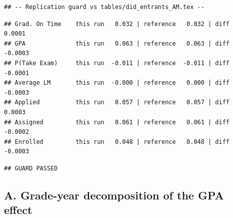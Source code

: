 \documentclass[
]{article}
\begin{document}
\begin{table}[htbp]
   \caption{Regression Results: All 9th-Grade Entrants (Guard Replication)}\label{tab: entrants guard}
   \centerline{}
\end{table}

\begin{verbatim}
## -- Replication guard vs tables/did_entrants_AM.tex --
\end{verbatim}

\begin{verbatim}
## Grad. On Time    this run   0.032 | reference   0.032 | diff   0.0001
## GPA              this run   0.063 | reference   0.063 | diff  -0.0003
## P(Take Exam)     this run  -0.011 | reference  -0.011 | diff  -0.0001
## Average LM       this run  -0.000 | reference   0.000 | diff  -0.0003
## Applied          this run   0.057 | reference   0.057 | diff   0.0003
## Assigned         this run   0.061 | reference   0.061 | diff  -0.0002
## Enrolled         this run   0.048 | reference   0.048 | diff  -0.0003
\end{verbatim}

\begin{verbatim}
## GUARD PASSED
\end{verbatim}

\hypertarget{a.-grade-year-decomposition-of-the-gpa-effect}{%
\subsection{A. Grade-year decomposition of the GPA
effect}\label{a.-grade-year-decomposition-of-the-gpa-effect}}
\end{document}

